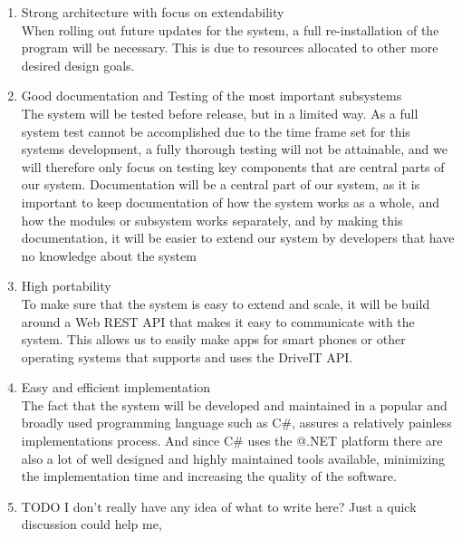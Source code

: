 \begin{enumerate}
\item Strong architecture with focus on extendability\\
When rolling out future updates for the system, a full re-installation of the program will be necessary. This is due to resources allocated to other more desired design goals.\\

\item Good documentation and Testing of the most important subsystems\\
The system will be tested before release, but in a limited way. As a full system test cannot be accomplished due to the time frame set for this systems development, a fully thorough testing will not be attainable, and we will therefore only focus on testing key components that are central parts of our system.
Documentation will be a central part of our system, as it is important to keep documentation of how the system works as a whole, and how the modules or subsystem works separately, and by making this documentation, it will be easier to extend our system by developers that have no knowledge about the system\\

\item High portability \\
To make sure that the system is easy to extend and scale, it will be build around a Web REST API that makes it easy to communicate with the system. This allows us to easily make apps for smart phones or other operating systems that supports and uses the DriveIT API. 

\item Easy and efficient implementation\\
The fact that the system will be developed and maintained in a popular and broadly used programming language such as C\#, assures a relatively painless implementations process. And since C\# uses the @.NET platform there are also a lot of well designed and highly maintained tools available, minimizing the implementation time and increasing the quality of the software.

\item TODO I don't really have any idea of what to write here? Just a quick discussion could help me,
\end{enumerate} 
